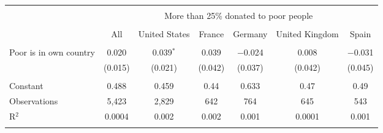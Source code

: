 
\begin{tabular}{@{\extracolsep{5pt}}lcccccc} 
\\[-1.8ex]\hline 
\hline \\[-1.8ex] 
 & \multicolumn{6}{c}{More than 25\% donated to poor people} \\ 
\cline{2-7} 
\\[-1.8ex] & All & United States & France & Germany & United Kingdom & Spain \\ 
\hline \\[-1.8ex] 
 Poor is in own country & 0.020 & 0.039$^{*}$ & 0.039 & $-$0.024 & 0.008 & $-$0.031 \\ 
  & (0.015) & (0.021) & (0.042) & (0.037) & (0.042) & (0.045) \\ 
 \hline \\[-1.8ex] 
Constant & 0.488 & 0.459 & 0.44 & 0.633 & 0.47 & 0.49 \\ 
Observations & 5,423 & 2,829 & 642 & 764 & 645 & 543 \\ 
R$^{2}$ & 0.0004 & 0.002 & 0.002 & 0.001 & 0.0001 & 0.001 \\ 
\hline 
\hline \\[-1.8ex] 
\end{tabular} 